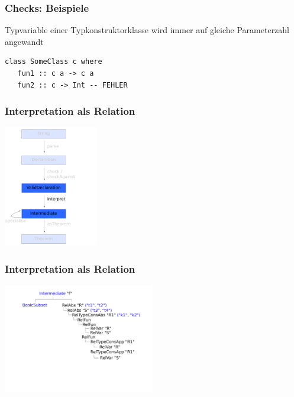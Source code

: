 \documentclass{beamer}
\begin{document}

\begin{frame}[fragile]
\frametitle{Checks: Beispiele}

Typvariable einer Typkonstruktorklasse wird immer auf gleiche Parameterzahl angewandt

\begin{verbatim}
class SomeClass c where
   fun1 :: c a -> c a
   fun2 :: c -> Int -- FEHLER
\end{verbatim}

\end{frame}


\begin{frame}
\frametitle{Interpretation als Relation}
\begin{center}
\includegraphics[height=200px]{overview-free-theorems-interpret}
\end{center}
\end{frame}


\begin{frame}
\frametitle{Interpretation als Relation}

\begin{center}
\includegraphics[width=250px]{intermediate}
\end{center}

\end{frame}
\end{document}
